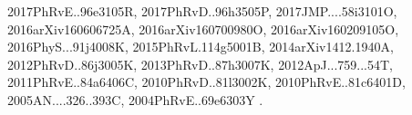 \documentclass[12pt]{article}
\begin{document}
\begin{enumerate}
\begin{enumerate}
{2017PhRvE..96e3105R,%
2017PhRvD..96h3505P,%
2017JMP....58i3101O,%
2016arXiv160606725A,%
2016arXiv160700980O,%
2016arXiv160209105O,%
2016PhyS...91j4008K,%
2015PhRvL.114g5001B,%
2014arXiv1412.1940A,%
2012PhRvD..86j3005K,%
2013PhRvD..87h3007K,%
2012ApJ...759...54T,%
2011PhRvE..84a6406C,%
2010PhRvD..81l3002K,%
2010PhRvE..81c6401D,%
2005AN....326..393C,%
2004PhRvE..69e6303Y%
}.


\end{enumerate}
\end{enumerate}
\end{document}
